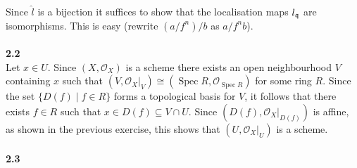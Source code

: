 \documentclass[12pt]{article}
\numberwithin{thm}{subsection}
\numberwithin{defn}{subsection}
\numberwithin{lemma}{subsection}
\numberwithin{example}{subsection}
\numberwithin{notation}{subsection}
\numberwithin{cor}{subsection}
\numberwithin{remark}{subsection}
\numberwithin{condition}{subsection}
\numberwithin{question}{subsection}
\numberwithin{construction}{subsection}
\numberwithin{construction}{subsection}
\numberwithin{construction}{subsection}
\begin{document}
Since $\hat{l}$ is a bijection it suffices to show that the localisation maps $l_{\frak{q}}$ are isomorphisms. This is easy (rewrite $(a/f^n)/b$ as $a/f^nb$).\\\\
%
\textbf{2.2}\\
Let $x \in U$. Since $(X,\mathcal{O}_X)$ is a scheme there exists an open neighbourhood $V$ containing $x$ such that $(V, \mathcal{O}_X\vert_V) \cong (\operatorname{Spec}R, \mathcal{O}_{\operatorname{Spec}R})$ for some ring $R$. Since the set $\{D(f) \mid f \in R\}$ forms a topological basis for $V$, it follows that there exists $f \in R$ such that $x \in D(f) \subseteq V \cap U$. Since $(D(f), \mathcal{O}_X\vert_{D(f)})$ is affine, as shown in the previous exercise, this shows that $(U, \mathcal{O}_X\vert_{U})$ is a scheme.\\\\
%
\textbf{2.3}\\
\end{document}
